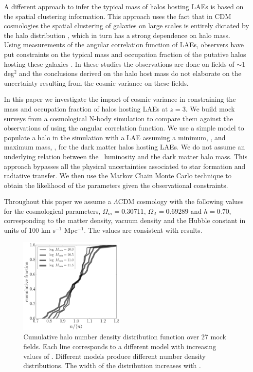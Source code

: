 \documentclass{emulateapj}
\newcommand{\ly}{{\ifmmode{{\rm Ly}\alpha}\else{Ly$\alpha$}\fi}}
\newcommand{\mmin}{{\ifmmode{{M_{\rm min}}}\else{${M_{\rm min}}$}\fi}}
\newcommand{\mmax}{{\ifmmode{{M_{\rm max}}}\else{${M_{\rm max}}$}\fi}}
\begin{document}
A different approach to infer the typical mass of halos hosting
LAEs is based on the spatial clustering information. 
This approach uses the fact
that in CDM cosmologies the spatial clustering of galaxies on large
scales is entirely dictated by the halo distribution
\citep{Colberg00}, which in turn has a strong dependence on halo
mass. 
Using measurements of the angular correlation function of LAEs,
observers have put constraints on the typical mass and occupation
fraction of the putative halos hosting these galaxies
\citep{Hayashino2004,Gawiser07,Nilsson2007,Ouchi2010,Bielby16}. 
In these studies the observations are done on fields of $\sim 1$ deg$^{2}$ and
the conclusions derived on the halo host mass do not elaborate on the
uncertainty resulting from the cosmic variance on these fields. 

In this paper we investigate the impact of cosmic variance in
constraining the mass and occupation fraction of halos hosting LAEs at $z=3$.
We build mock surveys from a cosmological N-body simulation to compare them
against the observations of \cite{Bielby16} using the angular
correlation function.  
We use a simple model to populate a halo in the simulation with a LAE   
assuming a minimum, \mmin, and maximum mass, \mmax, for the dark
matter halos hosting LAEs. We do not  assume  an underlying relation 
between the \ly\  luminosity and the dark matter halo mass.  
This approach bypasses all the physical uncertainties associated to
star formation and radiative transfer. 
We then use the Markov Chain Monte Carlo technique to obtain the
likelihood of the parameters given the observational constraints. 

Throughout this paper we assume a $\Lambda$CDM cosmology with the
following values for the cosmological parameters, $\Omega_{m}=0.30711$,
$\Omega_{\Lambda}=0.69289$ and $h=0.70$, corresponding to the matter
density, vacuum density and the Hubble constant in units of 100 km
s$^{-1}$ Mpc$^{-1}$.  The values are consistent with \citet{Planck2014} results.


\begin{figure}
\includegraphics[width=0.47\textwidth]{fig1.pdf}
\caption{Cumulative halo number density distribution function over
  27 mock fields. Each line corresponds to a
  different model with increasing values of \mmin. 
  Different models produce different number density distributions. 
  The width of the distribution increases with \mmin. } 
\label{fig:cosmicv0}
\end{figure}
\end{document}
